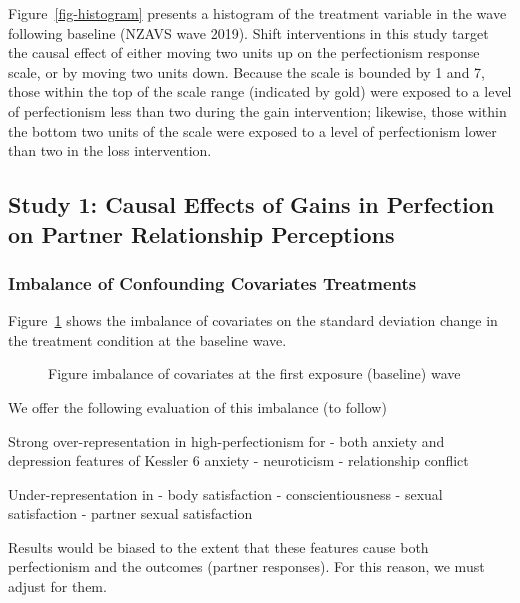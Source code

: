 \documentclass[
  singlecolumn]{article}
\begin{document}
Figure~\ref{fig-histogram} presents a histogram of the treatment
variable in the wave following baseline (NZAVS wave 2019). Shift
interventions in this study target the causal effect of either moving
two units up on the perfectionism response scale, or by moving two units
down. Because the scale is bounded by 1 and 7, those within the top of
the scale range (indicated by gold) were exposed to a level of
perfectionism less than two during the gain intervention; likewise,
those within the bottom two units of the scale were exposed to a level
of perfectionism lower than two in the loss intervention.

\subsection{Study 1: Causal Effects of Gains in Perfection on Partner
Relationship
Perceptions}\label{study-1-causal-effects-of-gains-in-perfection-on-partner-relationship-perceptions}

\subsubsection{Imbalance of Confounding Covariates
Treatments}\label{imbalance-of-confounding-covariates-treatments}

Figure~\ref{fig-match_base} shows the imbalance of covariates on the
standard deviation change in the treatment condition at the baseline
wave.

\begin{figure}


\caption{\label{fig-match_base}Figure imbalance of covariates at the
first exposure (baseline) wave}

\end{figure}%

We offer the following evaluation of this imbalance (to follow)

Strong over-representation in high-perfectionism for - both anxiety and
depression features of Kessler 6 anxiety - neuroticism - relationship
conflict

Under-representation in - body satisfaction - conscientiousness - sexual
satisfaction - partner sexual satisfaction

Results would be biased to the extent that these features cause both
perfectionism and the outcomes (partner responses). For this reason, we
must adjust for them.
\end{document}
